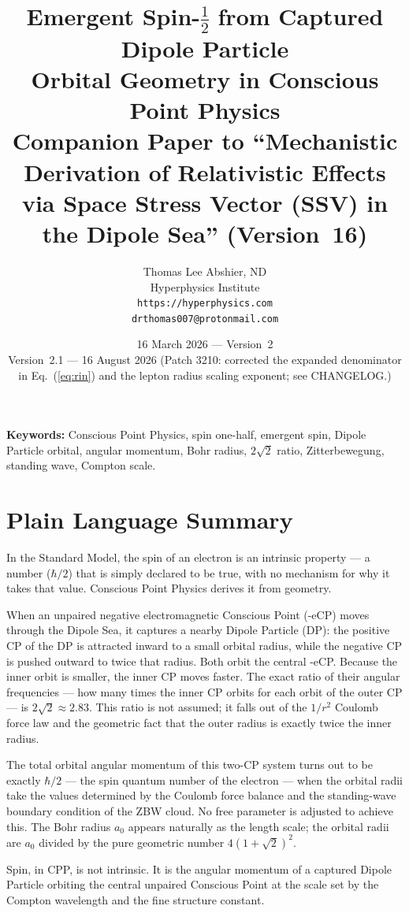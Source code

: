 \documentclass[12pt]{article}
\title{\textbf{Emergent Spin-$\tfrac{1}{2}$ from Captured Dipole Particle\\
Orbital Geometry in Conscious Point Physics}\\[6pt]
{\large Companion Paper to ``Mechanistic Derivation of Relativistic Effects\\
via Space Stress Vector (SSV) in the Dipole Sea'' (Version~16)}}
\author{Thomas Lee Abshier, ND\\
Hyperphysics Institute\\
\texttt{https://hyperphysics.com}\\
\texttt{drthomas007@protonmail.com}}
\date{16 March 2026 --- Version~2\\[2pt]
{\small Version~2.1 --- 16 August 2026 (Patch 3210: corrected the
expanded denominator in Eq.~(\ref{eq:rin}) and the lepton radius
scaling exponent; see CHANGELOG.)}}
\newcommand{\aBohr}{a_0}
\begin{document}
\maketitle

\noindent\textbf{Keywords:} Conscious Point Physics, spin one-half,
emergent spin, Dipole Particle orbital, angular momentum, Bohr radius,
$2\sqrt{2}$ ratio, Zitterbewegung, standing wave, Compton scale.

\section*{Plain Language Summary}

In the Standard Model, the spin of an electron is an intrinsic property
--- a number ($\hbar/2$) that is simply declared to be true, with no
mechanism for why it takes that value.  Conscious Point Physics derives
it from geometry.

When an unpaired negative electromagnetic Conscious Point (-eCP) moves
through the Dipole Sea, it captures a nearby Dipole Particle (DP): the
positive CP of the DP is attracted inward to a small orbital radius,
while the negative CP is pushed outward to twice that radius.  Both
orbit the central -eCP.  Because the inner orbit is smaller, the inner
CP moves faster.  The exact ratio of their angular frequencies --- how
many times the inner CP orbits for each orbit of the outer CP --- is
$2\sqrt{2} \approx 2.83$.  This ratio is not assumed; it falls out of
the $1/r^2$ Coulomb force law and the geometric fact that the outer
radius is exactly twice the inner radius.

The total orbital angular momentum of this two-CP system turns out to
be exactly $\hbar/2$ --- the spin quantum number of the electron ---
when the orbital radii take the values determined by the Coulomb force
balance and the standing-wave boundary condition of the ZBW cloud.  No
free parameter is adjusted to achieve this.  The Bohr radius $\aBohr$
appears naturally as the length scale; the orbital radii are $\aBohr$
divided by the pure geometric number $4(1+\sqrt{2})^2$.

Spin, in CPP, is not intrinsic.  It is the angular momentum of a
captured Dipole Particle orbiting the central unpaired Conscious Point
at the scale set by the Compton wavelength and the fine structure
constant.
\end{document}
